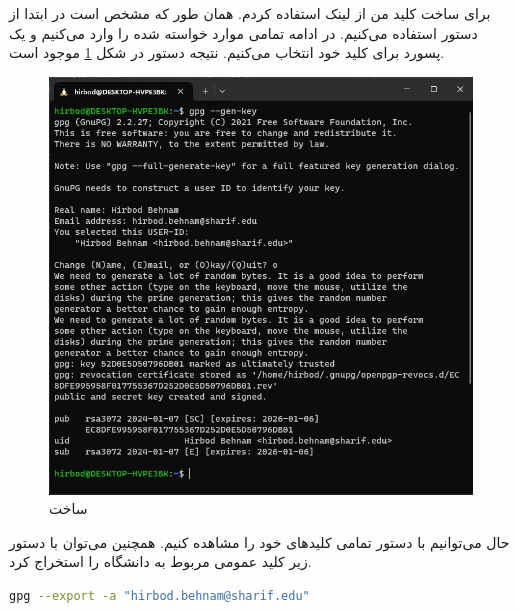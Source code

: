 \documentclass[]{article}
\begin{document}
\printheader

\section{}
\section{}
\subsection{}
برای ساخت کلید من از
لینک استفاده کردم. همان طور که مشخص است در ابتدا از دستور
استفاده می‌کنیم. در ادامه تمامی موارد خواسته شده را وارد می‌کنیم و یک پسورد برای کلید خود انتخاب می‌کنیم.
نتیجه دستور در شکل
\ref{fig:gpg:keygen}
موجود است.
\begin{figure}[H]
    \centering
    \includegraphics[scale=0.5]{pics/gpg-keygen.jpg}
    \caption{ساخت }
    \label{fig:gpg:keygen}
\end{figure}
حال می‌توانیم با دستور
تمامی کلید‌های خود را مشاهده کنیم. همچنین می‌توان با دستور زیر کلید عمومی مربوط به دانشگاه را استخراج کرد.
\begin{latin}
\begin{lstlisting}[language=sh]
gpg --export -a "hirbod.behnam@sharif.edu"
\end{lstlisting}
\end{latin}
\end{document}
